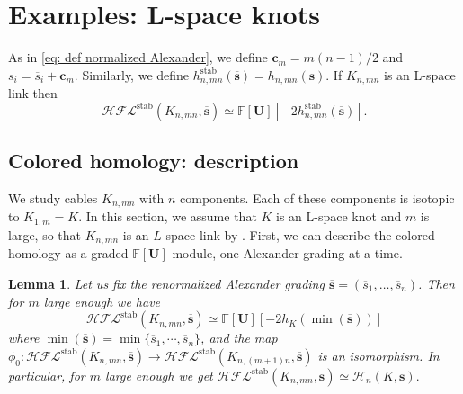 \documentclass{amsart}
\newtheorem{lemma}[theorem]{Lemma}
\newcommand{\CH}{\mathcal{H}}
\newcommand{\F}{\mathbb{F}}
\newcommand{\cHFL}{\mathcal{H\!F\! L}}
\def\gr{\textup{gr}}
\newcommand{\UU}{\mathbf{U}}
\newcommand{\A}{\mathfrak{A}}
\newcommand{\EG}[1]{{\color{red}#1}}
\newcommand{\cc}{\mathbf{c}}
\newcommand{\stab}{\mathrm{stab}}
\renewcommand{\ss}{\mathbf{s}}
\begin{document}
\section{Examples: L-space knots}
\label{sec: L space}

As in \eqref{eq: def normalized Alexander},
we define $\cc_m=m(n-1)/2$ and
$s_i=\overline{s}_i+\cc_m$. Similarly, we define $h^{\stab}_{n,mn}(\overline{\ss})=h_{n,mn}(\ss)$. If $K_{n,mn}$ is an L-space link then 
$$
\cHFL^{\stab}(K_{n,mn},\overline{\ss})\simeq \F[\UU]
\left[-2h_{n,mn}^{\stab}(\overline{\ss})\right].
$$
 

\subsection{Colored homology: description}

We study cables $K_{n,mn}$ with $n$ components. Each of these components is isotopic to $K_{1,m}=K$. In this section, we assume that $K$ is an L-space knot and $m$ is large, so that $K_{n,mn}$ is an $L$-space link by \cite{GH}. 
First, we can describe the colored homology as a graded $\F[\UU]$-module, one Alexander grading at a time.   

\begin{lemma}
\label{lem: stable h}
Let us fix the renormalized Alexander grading $\overline{\ss}=(\overline{s}_1,\ldots,\overline{s}_n)$. Then for $m$ large enough we have 
$$
\cHFL^{\stab}(K_{n,mn},\overline{\ss})\simeq \F[\UU][-2h_K(\min(\overline{\ss}))]
$$  
where $\min(\overline{\ss})=\min\{\overline{s}_1,\cdots,\overline{s}_n\}$, and the map $\phi_0:\cHFL^{\stab}(K_{n,mn},\overline{\ss})\to \cHFL^{\stab}(K_{n,(m+1)n},\overline{\ss})$ is an isomorphism. In particular,  for $m$ large enough we get
$
\cHFL^{\stab}(K_{n,mn},\overline{\ss})\simeq \CH_n(K,\overline{\ss}).
$
\end{lemma}
\end{document}
